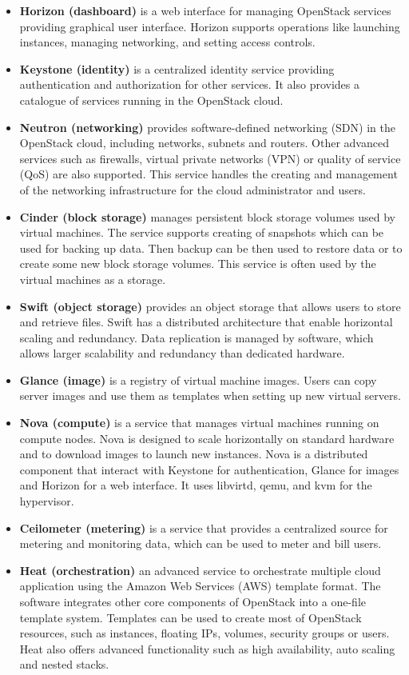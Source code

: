 \begin{itemize}
  \item{\textbf{Horizon (dashboard)} is a web interface for managing OpenStack services providing graphical user interface. Horizon supports operations like launching instances, managing networking, and setting access controls.}
  \item{\textbf{Keystone (identity)} is a centralized identity service providing authentication and authorization for other services. It also provides a catalogue of services running in the OpenStack cloud.}
  \item{\textbf{Neutron (networking)} provides software-defined networking (SDN) in the OpenStack cloud, including networks, subnets and routers. Other advanced services such as firewalls, virtual private networks (VPN) or quality of service (QoS) are also supported. This service handles the creating and management of the networking infrastructure for the cloud administrator and users.}
  \item{\textbf{Cinder (block storage)} manages persistent block storage volumes used by virtual machines. The service supports creating of snapshots which can be used for backing up data. Then backup can be then used to restore data or to create some new block storage volumes. This service is often used by the virtual machines as a storage.}
  \item{\textbf{Swift (object storage)} provides an object storage that allows users to store and retrieve files. Swift has a distributed architecture that enable horizontal scaling and redundancy. Data replication is managed by software, which allows larger scalability and redundancy than dedicated hardware.}
  \item{\textbf{Glance (image)} is a registry of virtual machine images. Users can copy server images and use them as templates when setting up new virtual servers.}
  \item{\textbf{Nova (compute)} is a service that manages virtual machines running on compute nodes. Nova is designed to scale horizontally on standard hardware and to download images to launch new instances. Nova is a distributed component that interact with Keystone for authentication, Glance for images and Horizon for a web interface. It uses libvirtd, qemu, and kvm for the hypervisor.}
  \item{\textbf{Ceilometer (metering)} is a service that provides a centralized source for metering and monitoring data, which can be used to meter and bill users.}
  \item{\textbf{Heat (orchestration)} an advanced service to orchestrate multiple cloud application using the Amazon Web Services (AWS) template format. The software integrates other core components of OpenStack into a one-file template system. Templates can be used to create most of OpenStack resources, such as instances, floating IPs, volumes, security groups or users. Heat also offers advanced functionality such as high availability, auto scaling and nested stacks.}
\end{itemize}

